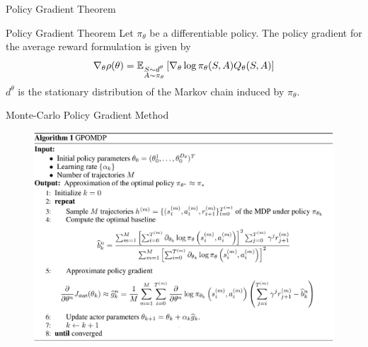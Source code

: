 \begin{frame}{Policy Gradient Theorem}
	\begin{block}{Policy Gradient Theorem}
			Let $\pi_\theta$ be a differentiable policy. The policy gradient for the average reward formulation is given by
			\begin{equation*}
				\nabla_\theta \rho(\theta) =
				\E[\substack{S \sim d^\theta\\A \sim \pi_\theta}]{\nabla_\theta\log
				\pi_\theta(S,A) Q_{\theta}(S, A)}
			\end{equation*}
			$d^\theta$ is the stationary distribution of the Markov chain induced by $\pi_\theta$.
	\end{block}
\end{frame}

\begin{frame}{Monte-Carlo Policy Gradient Method}
	\begin{figure}[h]
		\centering
		\includegraphics[width=1.0\framewidth]{Images/gpomdp}
	\end{figure}
\end{frame}
